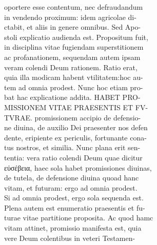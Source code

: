 \documentclass{article}
\begin{document}
\begin{pages}
                oportere esse contentum, nec defraudandum \\
                in vendendo proximum: idem agricolae di- \\
                ctabit, et aliis in genere omnibus. Sed Apo- \\
                stoli explicatio audienda est. Propositum fuit, \\
                in disciplina vitae fugiendam superstitionem \\
                ac profanationem, sequendam autem ipsam \\
                veram colendi Deum rationem. Ratio erat, \\
                quia illa modicam habent vtilitatem:hoc au- \\
                tem ad omnia prodest. Nunc hoc etiam pro- \\
                bat hac explicatione addita. HABET PRO- \\
                MISSIONEM VITAE PRAESENTIS ET FV- \\
                TVRAE. promissionem accipio de defensio- \\
                ne diuina, de auxilio Dei praesenter nos defen \\
                dente, eripiente ex periculis, fortunante cona- \\
                tus nostros, et similia. Nunc plana erit sen- \\
                tentia: vera ratio colendi Deum quae dicitur \\
                εὐσέβεια, haec sola habet promissiones diuinas, \\
                de tutela, de defensione diuina quoad hanc \\
                vitam, et futuram: ergo ad omnia prodest. \\
                Si ad omnia prodest, ergo sola sequenda est. \\
                Plena autem est enumeratio praesentis et fu- \\
                turae vitae partitione proposita. Ac quod hamc \\
                vitam attinet, promissio manifesta est, quia \\
                vere Deum colentibus in veteri Testamen- \\

\end{pages}
\end{document}
